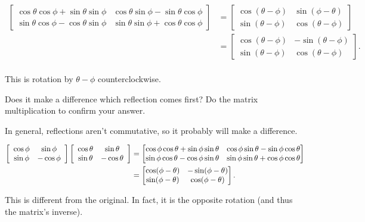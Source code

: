 \documentclass[../key.tex]{subfiles}
\begin{document}
\begin{align*}
    \begin{bmatrix}
\cos\theta\cos\phi + \sin\theta\sin\phi & \cos\theta\sin\phi-\sin\theta\cos\phi \\ \sin\theta\cos\phi-\cos\theta\sin\phi & \sin\theta\sin\phi + \cos\theta\cos\phi \end{bmatrix} &= \begin{bmatrix}\cos(\theta-\phi) & \sin(\phi-\theta) \\ \sin(\theta-\phi) & \cos(\theta-\phi)\end{bmatrix} \\
            &=\begin{bmatrix}\cos(\theta-\phi) & -\sin(\theta-\phi) \\ \sin(\theta-\phi) & \cos(\theta-\phi)\end{bmatrix}. \\
    \end{align*}

This is rotation by $\theta-\phi$ counterclockwise.

\begin{inner_problem}
\item Does it make a difference which reflection comes first? Do the matrix multiplication to confirm your answer.
\end{inner_problem}

In general, reflections aren't commutative, so it probably will make a difference.

\begin{align*}
        \left[\begin{array}{cc} \cos\phi & \sin\phi \\ \sin\phi & -\cos\phi \end{array}\right]\left[\begin{array}{cc} \cos\theta & \sin\theta \\ \sin\theta & -\cos\theta \end{array}\right]&=\begin{bmatrix} \cos\phi\cos\theta + \sin\phi\sin\theta & \cos\phi\sin\theta - \sin\phi\cos\theta \\ \sin\phi\cos\theta - \cos\phi\sin\theta & \sin\phi\sin\theta + \cos\phi\cos\theta \\ \end{bmatrix} \\
         &= \begin{bmatrix}\cos(\phi-\theta) & -\sin(\phi-\theta) \\ \sin(\phi-\theta) & \cos(\phi-\theta)\end{bmatrix}.
\end{align*}

This is different from the original. In fact, it is the opposite rotation (and thus the matrix's inverse).
\end{document}
